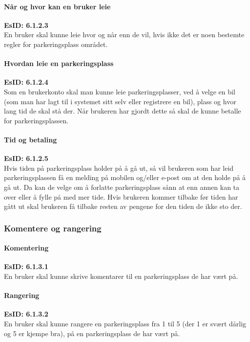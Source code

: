 \documentclass[12pt]{article}
\begin{document}
            \paragraph{Når og hvor kan en bruker leie}
            \textbf{EsID: 6.1.2.3}\\En bruker skal kunne leie hvor og når enn de vil, hvis ikke det er noen bestemte regler for parkeringsplass området.

            \paragraph{Hvordan leie en parkeringsplass}
            \textbf{EsID: 6.1.2.4}\\Som en brukerkonto skal man kunne leie parkeringsplasser, ved å velge en bil (som man har lagt til i systemet sitt selv eller registrere en bil), plass og hvor lang tid de skal stå der. Når brukeren har gjordt dette så skal de kunne betalle for parkeringsplassen.

            \paragraph{Tid og betaling}
            \textbf{EsID: 6.1.2.5}\\Hvis tiden på parkeringsplass holder på å gå ut, så vil brukeren som har leid parkeringsplassen få en melding på mobilen og/eller e-post om at den holde på å gå ut. Da kan de velge om å forlatte parkeringsplass sånn at enn annen kan ta over eller å fylle på med mer tide. Hvis brukeren kommer tilbake før tiden har gått ut skal brukeren få tilbake resten av pengene for den tiden de ikke sto der.

        \subsubsection{Komentere og rangering}

            \paragraph{Komentering}
            \textbf{EsID: 6.1.3.1}\\En bruker skal kunne skrive komentarer til en parkeringsplass de har vært på. 

            \paragraph{Rangering}
            \textbf{EsID: 6.1.3.2}\\En bruker skal kunne rangere en parkeringsplass fra 1 til 5 (der 1 er svært dårlig og 5 er kjempe bra), på en parkeringsplass de har vært på.
\end{document}
